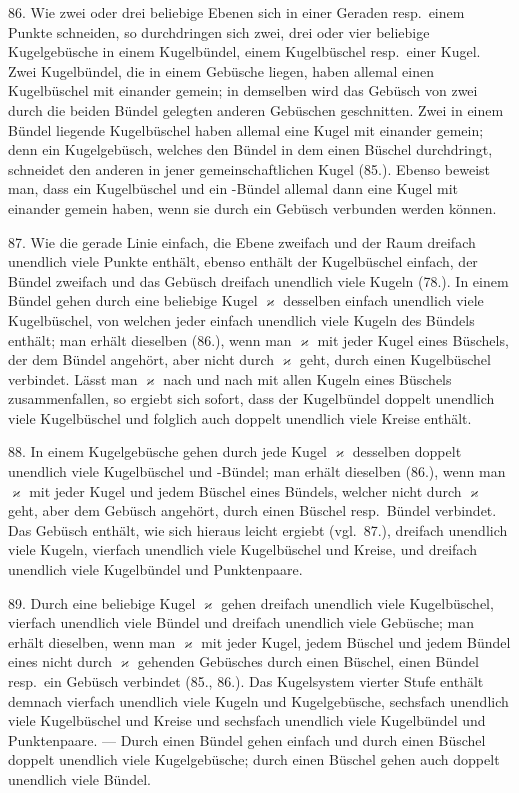 86. Wie zwei oder drei beliebige Ebenen sich in einer
Geraden resp.\ einem Punkte schneiden, so durchdringen sich
zwei, drei oder vier beliebige Kugelgeb\"usche in einem Kugelb\"undel,
einem Kugelb\"uschel resp.\ einer Kugel. Zwei Kugelb\"undel,
die in einem Geb\"usche liegen, haben allemal einen
Kugelb\"uschel mit einander gemein; in demselben wird das
Geb\"usch von zwei durch die beiden B\"undel gelegten anderen
Geb\"uschen geschnitten. Zwei in einem B\"undel liegende Kugelb\"uschel
haben allemal eine Kugel mit einander gemein;
denn ein Kugelgeb\"usch, welches den B\"undel in dem einen
B\"uschel durchdringt, schneidet den anderen in jener gemeinschaftlichen
Kugel (85.). Ebenso beweist man, dass ein
Kugelb\"uschel und ein -B\"undel allemal dann eine Kugel mit
einander gemein haben, wenn sie durch ein Geb\"usch verbunden
werden k\"onnen.

87. Wie die gerade Linie einfach, die Ebene zweifach
und der Raum dreifach unendlich viele Punkte enth\"alt,
ebenso enth\"alt der Kugelb\"uschel einfach, der B\"undel zweifach
und das Geb\"usch dreifach unendlich viele Kugeln (78.).
In einem B\"undel gehen durch eine beliebige Kugel $\varkappa$ desselben
einfach unendlich viele Kugelb\"uschel, von welchen jeder einfach
unendlich viele Kugeln des B\"undels enth\"alt; man erh\"alt
dieselben (86.), wenn man $\varkappa$ mit jeder Kugel eines B\"uschels,
der dem B\"undel angeh\"ort, aber nicht durch $\varkappa$ geht, durch
einen Kugelb\"uschel verbindet. L\"asst man $\varkappa$ nach und nach
mit allen Kugeln eines B\"uschels zusammenfallen, so ergiebt
sich sofort, dass der Kugelb\"undel doppelt unendlich viele
Kugelb\"uschel und folglich auch doppelt unendlich viele Kreise
enth\"alt.

88. In einem Kugelgeb\"usche gehen durch jede Kugel $\varkappa$
desselben doppelt unendlich viele Kugelb\"uschel und -B\"undel;
man erh\"alt dieselben (86.), wenn man $\varkappa$ mit jeder Kugel
und jedem B\"uschel eines B\"undels, welcher nicht durch $\varkappa$
geht, aber dem Geb\"usch angeh\"ort, durch einen B\"uschel resp.\ B\"undel
verbindet. Das Geb\"usch enth\"alt, wie sich hieraus
leicht ergiebt (vgl.\ 87.), dreifach unendlich viele Kugeln,
vierfach unendlich viele Kugelb\"uschel und Kreise, und dreifach
unendlich viele Kugelb\"undel und Punktenpaare.


89. Durch eine beliebige Kugel $\varkappa$ gehen dreifach unendlich
viele Kugelb\"uschel, vierfach unendlich viele B\"undel
und dreifach unendlich viele Geb\"usche; man erh\"alt dieselben,
wenn man $\varkappa$ mit jeder Kugel, jedem B\"uschel und jedem
B\"undel eines nicht durch $\varkappa$ gehenden Geb\"usches durch einen
B\"uschel, einen B\"undel resp.\ ein Geb\"usch verbindet (85., 86.).
Das Kugelsystem vierter Stufe enth\"alt demnach vierfach unendlich
viele Kugeln und Kugelgeb\"usche, sechsfach unendlich
viele Kugelb\"uschel und Kreise und sechsfach unendlich viele
Kugelb\"undel und Punktenpaare. --- Durch einen B\"undel gehen
einfach und durch einen B\"uschel doppelt unendlich viele
Kugelge\-b\"u\-sche; durch einen B\"uschel gehen auch doppelt
unendlich viele B\"undel.

